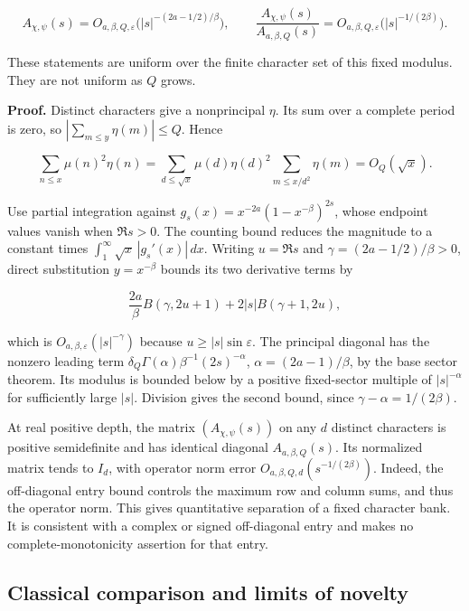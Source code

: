 \[
 A_{\chi,\psi}(s)
 =O_{a,\beta,Q,\varepsilon}\bigl(|s|^{-(2a-1/2)/\beta}\bigr),
 \qquad
 \frac{A_{\chi,\psi}(s)}{A_{a,\beta,Q}(s)}
 =O_{a,\beta,Q,\varepsilon}\bigl(|s|^{-1/(2\beta)}\bigr).
\]

These statements are uniform over the finite character set of this fixed
modulus. They are not uniform as \(Q\) grows.

\textbf{Proof.} Distinct characters give a nonprincipal \(\eta\). Its
sum over a complete period is zero, so \(|\sum_{m\le y}\eta(m)|\le Q\).
Hence

\[
 \sum_{n\le x}\mu(n)^2\eta(n)
 =\sum_{d\le\sqrt x}\mu(d)\eta(d)^2
     \sum_{m\le x/d^2}\eta(m)=O_Q(\sqrt x).
\]

Use partial integration against \(g_s(x)=x^{-2a}(1-x^{-\beta})^{2s}\),
whose endpoint values vanish when \(\Re s>0\). The counting bound
reduces the magnitude to a constant times
\(\int_1^\infty\sqrt x\,|g_s'(x)|\,dx\). Writing \(u=\Re s\) and
\(\gamma=(2a-1/2)/\beta>0\), direct substitution \(y=x^{-\beta}\) bounds
its two derivative terms by

\[
 \frac{2a}{\beta}B(\gamma,2u+1)
 +2|s|B(\gamma+1,2u),
\]

which is \(O_{a,\beta,\varepsilon}(|s|^{-\gamma})\) because
\(u\ge |s|\sin\varepsilon\). The principal diagonal has the nonzero
leading term \(\delta_Q\Gamma(\alpha)\beta^{-1}(2s)^{-\alpha}\),
\(\alpha=(2a-1)/\beta\), by the base sector theorem. Its modulus is
bounded below by a positive fixed-sector multiple of \(|s|^{-\alpha}\)
for sufficiently large \(|s|\). Division gives the second bound, since
\(\gamma-\alpha=1/(2\beta)\).

At real positive depth, the matrix \((A_{\chi,\psi}(s))\) on any \(d\)
distinct characters is positive semidefinite and has identical diagonal
\(A_{a,\beta,Q}(s)\). Its normalized matrix tends to \(I_d\), with
operator norm error \(O_{a,\beta,Q,d}(s^{-1/(2\beta)})\). Indeed, the
off-diagonal entry bound controls the maximum row and column sums, and
thus the operator norm. This gives quantitative separation of a fixed
character bank. It is consistent with a complex or signed off-diagonal
entry and makes no complete-monotonicity assertion for that entry.

\hypertarget{classical-comparison-and-limits-of-novelty}{%
\subsection{Classical comparison and limits of
novelty}\label{classical-comparison-and-limits-of-novelty}}

